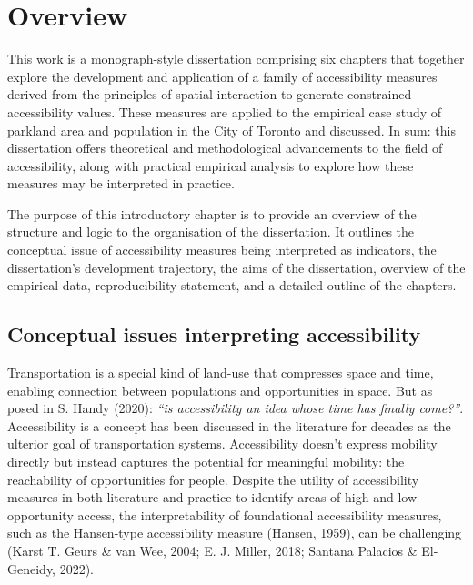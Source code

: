 \documentclass[
11pt, %
oneside, %
english, %
singlespacing, %
]{macthesis} %
\begin{document}

\mainmatter %
\pagestyle{thesis}
\chapter*{Overview}\label{overview}

This work is a monograph-style dissertation comprising six chapters that together explore the development and application of a family of accessibility measures derived from the principles of spatial interaction to generate constrained accessibility values. These measures are applied to the empirical case study of parkland area and population in the City of Toronto and discussed. In sum: this dissertation offers theoretical and methodological advancements to the field of accessibility, along with practical empirical analysis to explore how these measures may be interpreted in practice.

The purpose of this introductory chapter is to provide an overview of the structure and logic to the organisation of the dissertation. It outlines the conceptual issue of accessibility measures being interpreted as indicators, the dissertation's development trajectory, the aims of the dissertation, overview of the empirical data, reproducibility statement, and a detailed outline of the chapters.

\section{Conceptual issues interpreting accessibility}\label{conceptual-issues-interpreting-accessibility}

Transportation is a special kind of land-use that compresses space and time, enabling connection between populations and opportunities in space. But as posed in S. Handy (2020): \emph{``is accessibility an idea whose time has finally come?''}. Accessibility is a concept has been discussed in the literature for decades as the ulterior goal of transportation systems. Accessibility doesn't express mobility directly but instead captures the potential for meaningful mobility: the reachability of opportunities for people. Despite the utility of accessibility measures in both literature and practice to identify areas of high and low opportunity access, the interpretability of foundational accessibility measures, such as the Hansen-type accessibility measure (Hansen, 1959), can be challenging (Karst T. Geurs \& van Wee, 2004; E. J. Miller, 2018; Santana Palacios \& El-Geneidy, 2022).
\end{document}
